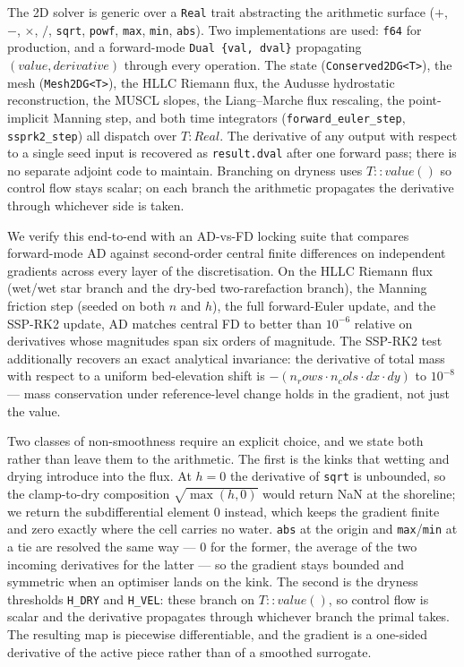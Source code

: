 The 2D solver is generic over a \texttt{Real} trait abstracting the
arithmetic surface (\(+\), \(-\), \(×\), \(/\), \texttt{sqrt},
\texttt{powf}, \texttt{max}, \texttt{min}, \texttt{abs}). Two
implementations are used: \texttt{f64} for production, and a
forward-mode \texttt{Dual\ \{val,\ dval\}} propagating
\((value, derivative)\) through every operation. The state
(\texttt{Conserved2DG\textless{}T\textgreater{}}), the mesh
(\texttt{Mesh2DG\textless{}T\textgreater{}}), the HLLC Riemann flux, the
Audusse hydrostatic reconstruction, the MUSCL slopes, the Liang--Marche
flux rescaling, the point-implicit Manning step, and both time
integrators (\texttt{forward\_euler\_step}, \texttt{ssprk2\_step}) all
dispatch over \(T: Real\). The derivative of any output with respect to
a single seed input is recovered as \texttt{result.dval} after one
forward pass; there is no separate adjoint code to maintain. Branching
on dryness uses \(T::value()\) so control flow stays scalar; on each
branch the arithmetic propagates the derivative through whichever side
is taken.

We verify this end-to-end with an AD-vs-FD locking suite that compares
forward-mode AD against second-order central finite differences on
independent gradients across every layer of the discretisation. On the
HLLC Riemann flux (wet/wet star branch and the dry-bed two-rarefaction
branch), the Manning friction step (seeded on both \(n\) and \(h\)), the
full forward-Euler update, and the SSP-RK2 update, AD matches central FD
to better than \(10^{-6}\) relative on derivatives whose magnitudes span
six orders of magnitude. The SSP-RK2 test additionally recovers an exact
analytical invariance: the derivative of total mass with respect to a
uniform bed-elevation shift is
\(-(n_rows \cdot n_cols \cdot dx \cdot dy)\) to \(10^{-8}\) --- mass
conservation under reference-level change holds in the gradient, not
just the value.

Two classes of non-smoothness require an explicit choice, and we state
both rather than leave them to the arithmetic. The first is the kinks
that wetting and drying introduce into the flux. At \(h = 0\) the
derivative of \texttt{sqrt} is unbounded, so the clamp-to-dry
composition \(\sqrt{\max(h, 0)}\) would return NaN at the shoreline; we
return the subdifferential element \(0\) instead, which keeps the
gradient finite and zero exactly where the cell carries no water.
\texttt{abs} at the origin and \texttt{max}/\texttt{min} at a tie are
resolved the same way --- \(0\) for the former, the average of the two
incoming derivatives for the latter --- so the gradient stays bounded
and symmetric when an optimiser lands on the kink. The second is the
dryness thresholds \texttt{H\_DRY} and \texttt{H\_VEL}: these branch on
\(T::value()\), so control flow is scalar and the derivative propagates
through whichever branch the primal takes. The resulting map is
piecewise differentiable, and the gradient is a one-sided derivative of
the active piece rather than of a smoothed surrogate.

